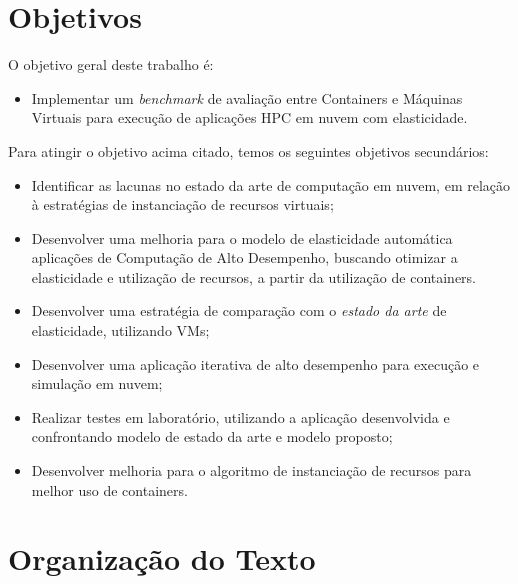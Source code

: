 \documentclass[twoside,english,brazilian]{UNISINOSartigo}
\begin{document}
\section{Objetivos} 
	O objetivo geral deste trabalho é:
	\begin{itemize}
		\item Implementar um \textit{benchmark} de avaliação entre Containers e Máquinas Virtuais para execução de aplicações HPC em nuvem com elasticidade.
	\end{itemize}
	Para atingir o objetivo acima citado, temos os seguintes objetivos secundários:
	\begin{itemize}
		\item Identificar as lacunas no estado da arte de computação em nuvem, em relação à estratégias de instanciação de recursos virtuais;		
		\item Desenvolver uma melhoria para o modelo de elasticidade automática aplicações de Computação de Alto Desempenho, buscando otimizar a elasticidade e utilização de recursos, a partir da utilização de containers.
		\item Desenvolver uma estratégia de comparação com o \textit{estado da arte} de elasticidade, utilizando VMs;
		\item Desenvolver uma aplicação iterativa de alto desempenho para execução e simulação em nuvem;
		\item Realizar testes em laboratório, utilizando a aplicação desenvolvida e confrontando modelo de estado da arte e modelo proposto;
		\item Desenvolver melhoria para o algoritmo de instanciação de recursos para melhor uso de containers.
	\end{itemize}

\section{Organização do Texto}
\end{document}
